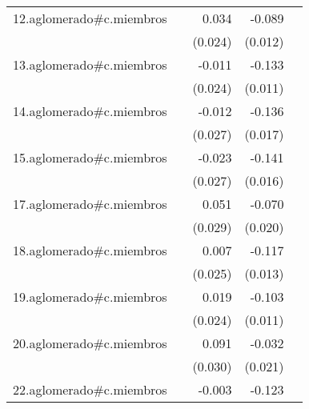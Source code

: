 {\begin{longtable}{l*{4}{D{.}{.}{-1}}}
\addlinespace
12.aglomerado#c.miembros&                     &       0.034         &      -0.089\sym{***}&                     \\
            &                     &     (0.024)         &     (0.012)         &                     \\
\addlinespace
13.aglomerado#c.miembros&                     &      -0.011         &      -0.133\sym{***}&                     \\
            &                     &     (0.024)         &     (0.011)         &                     \\
\addlinespace
14.aglomerado#c.miembros&                     &      -0.012         &      -0.136\sym{***}&                     \\
            &                     &     (0.027)         &     (0.017)         &                     \\
\addlinespace
15.aglomerado#c.miembros&                     &      -0.023         &      -0.141\sym{***}&                     \\
            &                     &     (0.027)         &     (0.016)         &                     \\
\addlinespace
17.aglomerado#c.miembros&                     &       0.051         &      -0.070\sym{***}&                     \\
            &                     &     (0.029)         &     (0.020)         &                     \\
\addlinespace
18.aglomerado#c.miembros&                     &       0.007         &      -0.117\sym{***}&                     \\
            &                     &     (0.025)         &     (0.013)         &                     \\
\addlinespace
19.aglomerado#c.miembros&                     &       0.019         &      -0.103\sym{***}&                     \\
            &                     &     (0.024)         &     (0.011)         &                     \\
\addlinespace
20.aglomerado#c.miembros&                     &       0.091\sym{**} &      -0.032         &                     \\
            &                     &     (0.030)         &     (0.021)         &                     \\
\addlinespace
22.aglomerado#c.miembros&                     &      -0.003         &      -0.123\sym{***}&                     \\

\end{longtable}}
